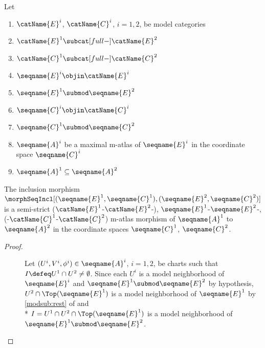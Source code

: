 \documentclass{article}
\begin{document}
\begin{lemma}
\label{lem:M-ATLid}
Let
\begin{enumerate}
\item
$\catName{E}^i$, $\catName{C}^i$, $i=1,2$, be model categories
\item
$\catName{E}^1 \subcat[full-] \catName{E}^2$
\item
$\catName{C}^1 \subcat[full-] \catName{C}^2$
\item
$\seqname{E}^i \objin \catName{E}^i$
\item
$\seqname{E}^1 \submod \seqname{E}^2$
\item
$\seqname{C}^i \objin \catName{C}^i$
\item
$\seqname{C}^1 \submod \seqname{C}^2$
\item
$\seqname{A}^i$ be a maximal m-atlas of $\seqname{E}^i$ in the
coordinate space $\seqname{C}^i$
\item
$\seqname{A}^1 \subseteq \seqname{A}^2$
\end{enumerate}

The inclusion morphism
$
  \morphSeqIncl%
    [
      {(\seqname{E}^1, \seqname{C}^1)},
      {(\seqname{E}^2, \seqname{C}^2)}
    ]
$
is a semi-strict
\nobreaks
  {
    {($\catName{E}^1$-$\catName{E}^2$-)},
    {$\seqname{E}^1$-$\seqname{E}^2$-},
    {(-$\catName{C}^1$-$\catName{C}^2$)}
  }
m-atlas morphism of
$\seqname{A}^1$ to $\seqname{A}^2$ in the coordinate spaces
$\seqname{C}^1$, $\seqname{C}^2$.

\begin{proof}
\begin{description}

\item%
  [
    \ensuremath
      {
        \morphSeqIncl%
          [
            {(\seqname{E}^1, \seqname{C}^1)},
            {(\seqname{E}^2, \seqname{C}^2)}
          ]
      }
    is an  m-atlas morphism:
  ]

Let $(U^i,V^i,\phi^i) \in \seqname{A}^i$, $i=1,2$, be charts such that
$I \defeq U^1 \cap U^2 \neq \emptyset$. Since each $U^i$ is a model
neighborhood of $\seqname{E}^i$ and
$\seqname{E}^1 \submod \seqname{E}^2$ by hypothesis,
$U^2 \cap \Top(\seqname{E}^1)$ is a model neighborhood of
$\seqname{E}^1$ by \cref{modsub:rest} of
{
  \showlabelsinline
}
and \\*
$I = U^1 \cap U^2 \cap \Top(\seqname{E}^1)$ is a model neighborhood
of $\seqname{E}^1 \submod \seqname{E}^2$.


\end{description}
\end{proof}
\end{lemma}
\end{document}
